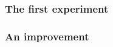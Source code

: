\documentclass[aspectratio=169]{beamer}
\begin{document}
\begin{frame}
\frametitle{The first experiment}
\begin{figure}[ht]\centering
{}
\end{figure}
\end{frame}

\begin{frame}
\frametitle{An improvement}
\begin{figure}[ht]\centering
{}
\end{figure}
\end{frame}
\end{document}
